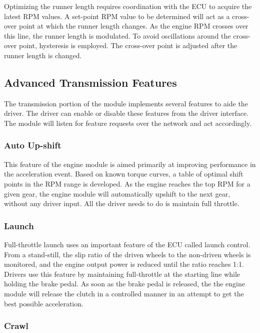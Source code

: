 Optimizing the runner length requires coordination with the ECU to acquire the latest RPM values. A set-point RPM value to be determined will act as a cross-over point at which the runner length changes. As the engine RPM crosses over this line, the runner length is modulated. To avoid oscillations around the cross-over point, hysteresis is employed. The cross-over point is adjusted after the runner length is changed.

\subsection{Advanced Transmission Features}

The transmission portion of the module implements several features to aide the driver. The driver can enable or disable these features from the driver interface. The module will listen for feature requests over the network and act accordingly.

\subsubsection{Auto Up-shift}

This feature of the engine module is aimed primarily at improving performance in the acceleration event. Based on known torque curves, a table of optimal shift points in the RPM range is developed. As the engine reaches the top RPM for a given gear, the engine module will automatically upshift to the next gear, without any driver input. All the driver needs to do is maintain full throttle.

\subsubsection{Launch}

Full-throttle launch uses an important feature of the ECU called launch control. From a stand-still, the slip ratio of the driven wheels to the non-driven wheels is monitored, and the engine output power is reduced until the ratio reaches 1:1. Drivers use this feature by maintaining full-throttle at the starting line while holding the brake pedal. As soon as the brake pedal is released, the the engine module will release the clutch in a controlled manner in an attempt to get the best possible acceleration.

\subsubsection{Crawl}

